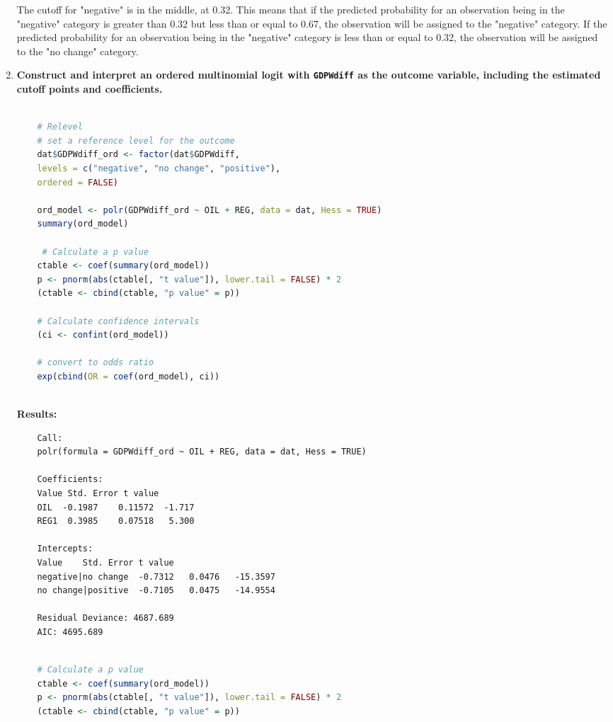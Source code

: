 \documentclass[12pt,letterpaper]{article}
\begin{document}
\begin{enumerate}
	\noindent The cutoff for "negative" is in the middle, at 0.32. This means that if the predicted probability for an observation being in the "negative" category is greater than 0.32 but less than or equal to 0.67, the observation will be assigned to the "negative" category. If the predicted probability for an observation being in the "negative" category is less than or equal to 0.32, the observation will be assigned to the "no change" category.\\
	
	\item \textbf{Construct and interpret an ordered multinomial logit with \texttt{GDPWdiff} as the outcome variable, including the estimated cutoff points and coefficients.}
	
	\begin{lstlisting}[language=R]
		
	# Relevel
	# set a reference level for the outcome
	dat$GDPWdiff_ord <- factor(dat$GDPWdiff, 
	levels = c("negative", "no change", "positive"),
	ordered = FALSE)
	
	ord_model <- polr(GDPWdiff_ord ~ OIL + REG, data = dat, Hess = TRUE)
	summary(ord_model)
	
	 # Calculate a p value
	ctable <- coef(summary(ord_model))
	p <- pnorm(abs(ctable[, "t value"]), lower.tail = FALSE) * 2
	(ctable <- cbind(ctable, "p value" = p))
	
	# Calculate confidence intervals
	(ci <- confint(ord_model))
	
	# convert to odds ratio
	exp(cbind(OR = coef(ord_model), ci))
		
	\end{lstlisting}

\noindent \textbf{Results:}

\begin{verbatim}
	Call:
	polr(formula = GDPWdiff_ord ~ OIL + REG, data = dat, Hess = TRUE)
	
	Coefficients:
	Value Std. Error t value
	OIL  -0.1987    0.11572  -1.717
	REG1  0.3985    0.07518   5.300
	
	Intercepts:
	Value    Std. Error t value 
	negative|no change  -0.7312   0.0476   -15.3597
	no change|positive  -0.7105   0.0475   -14.9554
	
	Residual Deviance: 4687.689 
	AIC: 4695.689 
\end{verbatim}

	\begin{lstlisting}[language=R]
	
	# Calculate a p value
	ctable <- coef(summary(ord_model))
	p <- pnorm(abs(ctable[, "t value"]), lower.tail = FALSE) * 2
	(ctable <- cbind(ctable, "p value" = p))
	

\end{lstlisting}
\end{enumerate}
\end{document}
